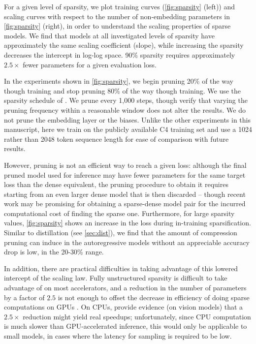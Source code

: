 \documentclass[11pt, a4paper, logo, internal, copyright, nonumbering]{deepmind}
\begin{document}
For a given level of sparsity, we plot training curves (\autoref{fig:sparsity} (left)) and scaling curves with respect to the number of non-embedding parameters in \autoref{fig:sparsity} (right), in order to understand the scaling properties of sparse models.
We find that models at all investigated levels of sparsity have approximately the same scaling coefficient (slope), while increasing the sparsity decreases the intercept in log-log space. 90\% sparsity requires approximately $2.5\times$ fewer parameters for a given evaluation loss.

In the experiments shown in \autoref{fig:sparsity}, we begin pruning 20\% of the way though training and stop pruning 80\% of the way though training. We use the sparsity schedule of \citet{zhu2017prune}.
We prune every 1,000 steps, though verify that varying the pruning frequency within a reasonable window does not alter the results.
We do not prune the embedding layer or the biases. Unlike the other experiments in this manuscript, here we train on the publicly available C4 training set \citep{raffel2019exploring} and use a 1024 rather than 2048 token sequence length for ease of comparison with future results.

However, pruning is not an efficient way to reach a given loss: although the final pruned model used for inference may have fewer parameters for the same target loss than the dense equivalent, the pruning procedure to obtain it requires starting from an even larger dense model that is then discarded -- though recent work \citep{acdctraining} may be promising for obtaining a sparse-dense model pair for the incurred computational cost of finding the sparse one. Furthermore, for large sparsity values, \autoref{fig:sparsity} shows an increase in the loss during in-training sparsification.
Similar to distillation (see \autoref{sec:dist}), we find that the amount of compression pruning can induce in the autoregressive models without an appreciable accuracy drop is low, in the 20-30\% range. 

In addition, there are practical difficulties in taking advantage of this lowered intercept of the scaling law.
Fully unstructured sparsity is difficult to take advantage of on most accelerators, and a reduction in the number of parameters by a factor of $2.5$ is not enough to offset the decrease in efficiency of doing sparse computations on GPUs \citep{gpusparsematmul}. On CPUs, \citet{fastsparseconvnets} provide evidence (on vision models) that a $2.5\times$ reduction might yield real speedups; unfortunately, since CPU computation is much slower than GPU-accelerated inference, this would only be applicable to small models, in cases where the latency for sampling is required to be low.
\end{document}
